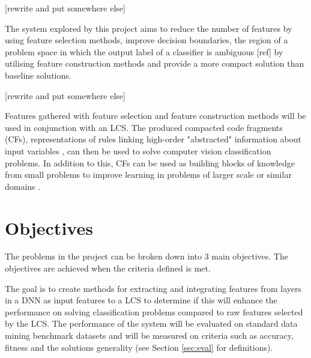 [rewrite and put somewhere else]

The system explored by this project aims to reduce the number of features by using feature selection methods, improve decision boundaries, the region of a problem space in which the output label of a classifier is ambiguous [ref] by utilising feature construction methods and provide a more compact solution than baseline solutions. 

[rewrite and put somewhere else]

Features gathered with feature selection and feature construction methods will be used in conjunction with an LCS. The produced compacted code fragments (CFs), representations of rules linking high-order "abstracted" information about input variables \cite{urbanowicz2017introduction}, can then be used to solve computer vision classification problems. In addition to this, CFs can be used as building blocks of knowledge from small problems to improve learning in problems of larger scale or similar domains \cite{urbanowicz2017introduction}. 

\section{Objectives} \label{subsec:obj}
The problems in the project can be broken down into 3 main objectives. The objectives are achieved when the criteria defined is met.

The goal is to create methods for extracting and integrating features from layers in a DNN as input features to a LCS to determine if this will enhance the performance on solving classification problems compared to raw features selected by the LCS. The performance of the system will be evaluated on standard data mining benchmark datasets and will be measured on criteria such as accuracy, fitness and the solution\textquotesingle s generality (see Section \ref{sec:eval} for definitions).
 

